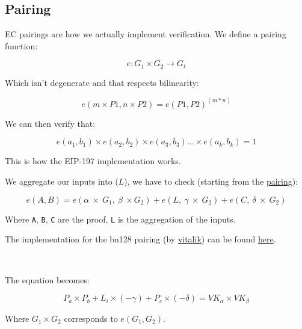 \documentclass{article}
\begin{document}
\subsection{Pairing}

EC pairings are how we actually implement verification. We define a pairing function:

\[ e: G_1 \times  G_2 \rightarrow G_t \]

Which isn't degenerate and that respects bilinearity:

\[ e ( m \times P1, n \times P2) = e ( P1, P2 ) ^ ( m * n ) \]

We can then verify that:

\[ e ( a_1, b_1) \times e ( a_2, b_2 ) \times e ( a_3, b_3 ) ... \times e ( a_k, b_k ) = 1 \]

This is how the EIP-197 implementation works.

We aggregate our inputs into (\(L\)), we have to check (starting from the \href{https://xn--2-umb.com/22/pairings/index.html}{pairing}):

\[ e(A, B) = e(\alpha \ \times \ G_1, \ \beta \ \times G_2) + e(L, \ \gamma \ \times \ G_2) + e(C, \ \delta \ \times \ G_2)\]

Where \texttt{A}, \texttt{B}, \texttt{C} are the proof, \texttt{L} is the aggregation of the inputs.

The implementation for the bn128 pairing (by \href{https://vitalik.ca}{vitalik}) can be found \href{https://github.com/ethereum/py_pairing/blob/master/py_ecc/bn128/bn128_pairing.py#L68}{here}.

\

The equation becomes:

\[ P_a \times P_b + L_i \times ( - \gamma ) + P_c \times ( - \delta ) = VK_{\alpha} \times VK_{\beta} \]

Where \( G_1 \times G_2 \) corresponds to \( e ( G_1 , G_2 ) \).
\end{document}
